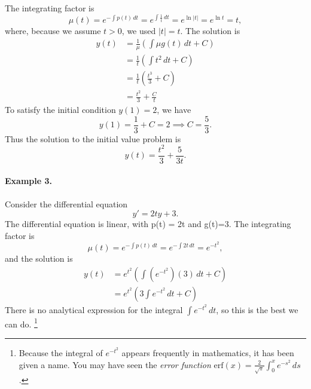 \documentclass{book}
\begin{document}
The integrating factor is
\begin{equation}
   \mu(t) = e^{-\int p(t)\,dt} = e^{\int \frac{1}{t}\, dt}
      = e^{\ln |t|} = e^{\ln t} = t,
\end{equation}
where, because we assume $t>0$,  we used $|t|=t$.
The solution is
\begin{equation}
\begin{split}
   y(t) & = \frac{1}{\mu} \left( \int \mu g(t)\,dt + C\right) \\
        & = \frac{1}{t} \left( \int t^2 \,dt+C\right) \\
	& = \frac{1}{t} \left( \frac{t^3}{3} + C \right)\\
	& = \frac{t^2}{3} + \frac{C}{t}
\end{split}
\end{equation}
To satisfy the initial condition $y(1)=2$, we have
\begin{equation}
   y(1) = \frac{1}{3} + C = 2 \implies C = \frac{5}{3}.
\end{equation}
Thus the solution to the initial value problem is
\begin{equation}
   y(t) = \frac{t^2}{3} + \frac{5}{3t}.
\end{equation}


\paragraph{Example 3.}
Consider the differential equation
\begin{equation}
    y' = 2ty + 3.
\end{equation}
The differential equation is linear, with p(t) = 2t and g(t)=3.
The integrating factor is
\begin{equation}
   \mu(t) = e^{-\int p(t)\,dt} = e^{-\int 2t\, dt}
      = e^{-t^2},
\end{equation}
and the solution is
\begin{equation}
\begin{split}
   y(t) & = e^{t^2} \left( \int \left(e^{-t^2}\right)\left(3\right)\,dt + C\right) \\
        & = e^{t^2} \left( 3\int e^{-t^2}\,dt+C\right)
\end{split}
\end{equation}
There is no analytical expression for the integral $\int e^{-t^2}\, dt$,
so this is the best we can do.%
\footnote{%
Because the integral of $e^{-t^2}$ appears frequently in mathematics,
it has been given a name.
You may have seen the \emph{error function}
$\textrm{erf}(x) = \frac{2}{\sqrt{\pi}}\int_0^x e^{-s^2}\,ds$.}
\end{document}
